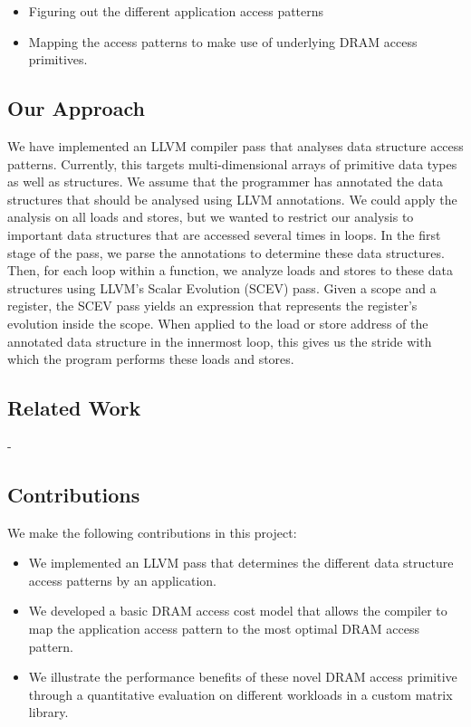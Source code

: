 \documentclass[letterpaper]{article}
\begin{document}
\begin{itemize}
  \item {Figuring out the different application access patterns}
  \item {Mapping the access patterns to make use of underlying DRAM access primitives.}
\end{itemize}

\subsection{Our Approach}

We have implemented an LLVM compiler pass that analyses data structure access patterns.
Currently, this targets multi-dimensional arrays of primitive data types as well as structures.
We assume that the programmer has annotated the data structures that should be
analysed using LLVM annotations.
We could apply the analysis on all loads and stores, but we wanted to restrict our
analysis to important data structures that are accessed several times in loops.
In the first stage of the pass, we parse the annotations to determine these data structures.
Then, for each loop within a function, we analyze loads and stores to these
data structures using LLVM's Scalar Evolution (SCEV) pass. Given a scope and a
register, the SCEV pass yields an expression that represents the register's
evolution inside the scope. When applied to the load or store address of the
annotated data structure in the innermost loop, this gives us the stride
with which the program performs these loads and stores.

\subsection{Related Work}

-

\subsection{Contributions}

We make the following contributions in this project:

\begin{itemize}
  \item {We implemented an LLVM pass that determines the different data
  structure access patterns by an application.}
  \item {We developed a basic DRAM access cost model that allows the compiler to
  map the application access pattern to the most optimal DRAM access pattern.}
  \item {We illustrate the performance benefits of these novel DRAM access primitive
  through a quantitative evaluation on different workloads in a custom matrix
  library.}
\end{itemize}
\end{document}
